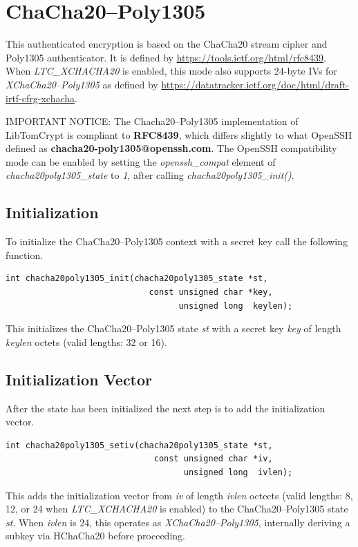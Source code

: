 \documentclass[synpaper]{book}
\newcommand{\mysection}[1]    %
	{                   %
	\section{#1}
   \markboth{\textsf{www.libtom.net}}{\thesection ~ {#1}}
	}
\begin{document}
\mysection{ChaCha20--Poly1305}
\label{chacha20poly1305}

This authenticated encryption is based on the ChaCha20 stream cipher and Poly1305 authenticator.
It is defined by \url{https://tools.ietf.org/html/rfc8439}.
When \textit{LTC\_XCHACHA20} is enabled, this mode also supports 24-byte IVs for
\textit{XChaCha20--Poly1305} as defined by
\url{https://datatracker.ietf.org/doc/html/draft-irtf-cfrg-xchacha}.

IMPORTANT NOTICE: The Chacha20--Poly1305 implementation of LibTomCrypt is compliant to \textbf{RFC8439}, which differs slightly
to what OpenSSH defined as \textbf{chacha20-poly1305@openssh.com}. The OpenSSH compatibility mode can be enabled
by setting the \textit{openssh\_compat} element of \textit{chacha20poly1305\_state} to \textit{1},
after calling \textit{chacha20poly1305\_init()}.

\subsection{Initialization}
To initialize the ChaCha20--Poly1305 context with a secret key call the following function.

\begin{verbatim}
int chacha20poly1305_init(chacha20poly1305_state *st,
                             const unsigned char *key,
                                   unsigned long  keylen);
\end{verbatim}
This initializes the ChaCha20--Poly1305 state \textit{st} with a secret key \textit{key} of length \textit{keylen}
octets (valid lengths: 32 or 16).

\subsection{Initialization Vector}
After the state has been initialized the next step is to add the initialization vector.

\begin{verbatim}
int chacha20poly1305_setiv(chacha20poly1305_state *st,
                              const unsigned char *iv,
                                    unsigned long  ivlen);
\end{verbatim}
This adds the initialization vector from \textit{iv} of length \textit{ivlen} octects (valid lengths: 8, 12,
or 24 when \textit{LTC\_XCHACHA20} is enabled) to the ChaCha20--Poly1305 state \textit{st}.
When \textit{ivlen} is 24, this operates as \textit{XChaCha20--Poly1305}, internally deriving
a subkey via HChaCha20 before proceeding.
\end{document}
